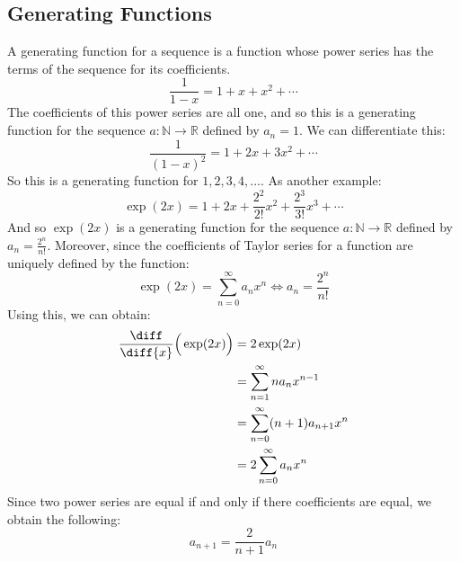        \subsection{Generating Functions}
            A generating function for a sequence is a function
            whose power series has the terms of the sequence
            for its coefficients.
            \begin{equation}
                \frac{1}{1-x}=1+x+x^{2}+\cdots
            \end{equation}
            The coefficients of this power series are all one,
            and so this is a generating function for the sequence
            $a:\mathbb{N}\rightarrow\mathbb{R}$ defined by
            $a_{n}=1$. We can differentiate this:
            \begin{equation}
                \frac{1}{(1-x)^{2}}=1+2x+3x^{2}+\cdots
            \end{equation}
            So this is a generating function for
            $1,2,3,4,\dots$. As another example:
            \begin{equation}
                \exp(2x)=1+2x+\frac{2^{2}}{2!}x^{2}
                +\frac{2^{3}}{3!}x^{3}+\cdots
            \end{equation}
            And so $\exp(2x)$ is a generating function for the
            sequence $a:\mathbb{N}\rightarrow\mathbb{R}$ defined by
            $a_{n}=\frac{2^{n}}{n!}$. Moreover, since the
            coefficients of Taylor series for a function are
            uniquely defined by the function:
            \begin{equation}
                \exp(2x)=\sum_{n=0}^{\infty}a_{n}x^{n}
                \Leftrightarrow{a}_{n}=\frac{2^{n}}{n!}
            \end{equation}
            Using this, we can obtain:
            \begin{align}
                \frac{\diff}{\diff{x}}\Big(\exp(2x)\Big)
                &=2\exp(2x)\\
                &=\sum_{n=1}^{\infty}na_{n}x^{n-1}\\
                &=\sum_{n=0}^{\infty}(n+1)a_{n+1}x^{n}\\
                &=2\sum_{n=0}^{\infty}a_{n}x^{n}
            \end{align}
            Since two power series are equal if and only if there
            coefficients are equal, we obtain the following:
            \begin{equation}
                a_{n+1}=\frac{2}{n+1}a_{n}
            \end{equation}
